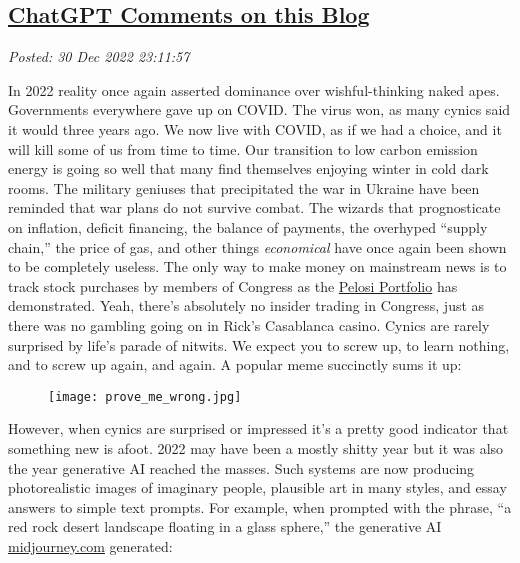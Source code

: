 %

\subsection*{\href{https://analyzethedatanotthedrivel.org/2022/12/30/chatgpt-comments-on-this-blog/}{ChatGPT Comments on this Blog}}


\noindent\emph{Posted: 30 Dec 2022 23:11:57}
\vspace{6pt}

In 2022 reality once again asserted dominance over wishful-thinking
naked apes. Governments everywhere gave up on COVID. The virus won, as
many cynics said it would three years ago. We now live with COVID, as if
we had a choice, and it will kill some of us from time to time. Our
transition to low carbon emission energy is going so well that many find
themselves enjoying winter in cold dark rooms. The military geniuses
that precipitated the war in Ukraine have been reminded that war plans
do not survive combat. The wizards that prognosticate on inflation,
deficit financing, the balance of payments, the overhyped ``supply
chain,'' the price of gas, and other things \emph{economical} have once
again been shown to be completely useless. The only way to make money on
mainstream news is to track stock purchases by members of Congress as
the
\href{https://www.investmentnews.com/pelosis-portfolio-performance-now-wrapped-in-an-etf-218304}{Pelosi
Portfolio} has demonstrated. Yeah, there's absolutely no insider trading
in Congress, just as there was no gambling going on in Rick's Casablanca
casino. Cynics are rarely surprised by life's parade of nitwits. We
expect you to screw up, to learn nothing, and to screw up again, and
again. A popular meme succinctly sums it up:

\captionsetup[figure]{labelformat=empty}
\begin{figure}[htbp]
\centering
\texttt{[image: prove\_me\_wrong.jpg]}
\caption[Prove me wrong meme]{}
 \label{fig:7681x0}
\end{figure}

However, when cynics are surprised or impressed it's a pretty good
indicator that something new is afoot. 2022 may have been a mostly
shitty year but it was also the year generative AI reached the masses.
Such systems are now producing photorealistic images of imaginary
people, plausible art in many styles, and essay answers to simple text
prompts. For example, when prompted with the phrase, ``a red rock desert
landscape floating in a glass sphere,'' the generative AI
\href{https://midjourney.com}{midjourney.com} generated:


